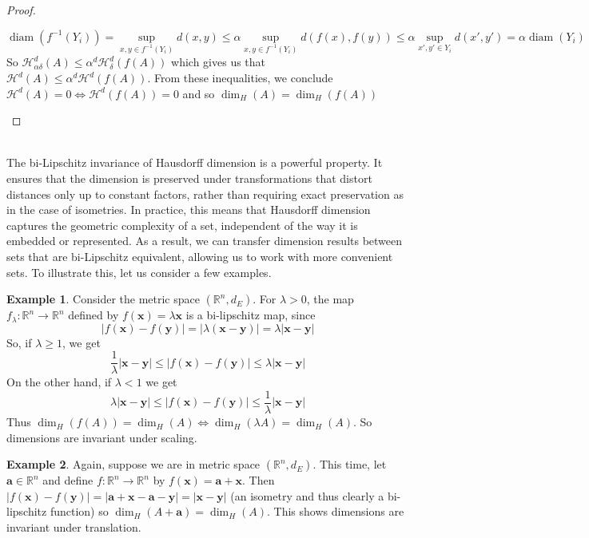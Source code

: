 \documentclass{article}
\theoremstyle{plain}
\theoremstyle{definition}
\newtheorem*{ex}{Example}
\DeclareMathOperator{\diam}{diam}
\theoremstyle{remark}
\begin{document}
\begin{proof}
\begin{enumerate}
        \[\diam (f^{-1}(Y_i)) = \sup \limits _{x,y \in f^{-1}(Y_i)} d(x,y) \le \alpha  \sup \limits _{x,y \in f^{-1}(Y_i)} d(f(x),f(y)) \le \alpha \sup \limits _{x',y' \in Y_i} d(x',y') = \alpha \diam (Y_i)  \]
        So $\mathcal{H}_{\alpha \delta}^d(A) \le \alpha ^d\mathcal{H}_\delta ^d(f(A))$ which gives us that $ \mathcal{H}^d(A) \le \alpha ^d\mathcal{H}^d(f(A))$. From these inequalities, we conclude $\mathcal{H}^d(A) =0 \iff \mathcal{H}^d(f(A))=0$ and so $\dim_H(A)=\dim_H(f(A))$
        \end{enumerate}
\end{proof}
~\\
The bi-Lipschitz invariance of Hausdorff dimension is a powerful property. It ensures that the dimension is preserved under transformations that distort distances only up to constant factors, rather than requiring exact preservation as in the case of isometries. In practice, this means that Hausdorff dimension captures the geometric complexity of a set, independent of the way it is embedded or represented. As a result, we can transfer dimension results between sets that are bi-Lipschitz equivalent, allowing us to work with more convenient sets. To illustrate this, let us consider a few examples.

\begin{ex}
    Consider the metric space $(\mathbb{R}^n, d_E)$. For $\lambda >0$, the map $f_\lambda :\mathbb{R}^n \to \mathbb{R}^n$ defined by $f(\mathbf{x})=\lambda \mathbf{x}$ is a bi-lipschitz map, since \[|f(\mathbf{x}) - f(\mathbf{y})| = |\lambda (\mathbf{x} - \mathbf{y})| = \lambda|\mathbf{x}-\mathbf{y}|\]So, if $\lambda \ge 1$, we get \[\frac{1}{\lambda }|\mathbf{x}-\mathbf{y}|\le |f(\mathbf{x}) - f(\mathbf{y})| \le \lambda |\mathbf{x}-\mathbf{y}|\]On the other hand, if $\lambda <1$ we get \[\lambda|\mathbf{x}-\mathbf{y}|\le |f(\mathbf{x}) - f(\mathbf{y})| \le \frac{1}{\lambda} |\mathbf{x}-\mathbf{y}|\]Thus $\dim_H(f(A)) = \dim_H(A) \iff \dim_H(\lambda A)=\dim_H(A)$. So dimensions are invariant under scaling.
\end{ex}

\begin{ex}
    Again, suppose we are in metric space $(\mathbb{R}^n, d_E)$. This time, let $\mathbf{a} \in \mathbb{R}^n$ and define $f:\mathbb{R}^n \to \mathbb{R}^n$ by $f(\mathbf{x})=\mathbf{a}+\mathbf{x}$. Then $|f(\mathbf{x} )-f(\mathbf{y})| = |\mathbf{a}+\mathbf{x}-\mathbf{a}-\mathbf{y}| = |\mathbf{x}-\mathbf{y}|$ (an isometry and thus clearly a bi-lipschitz function) so $\dim_H(A+\mathbf{a})=\dim_H(A)$. This shows dimensions are invariant under translation.
\end{ex}
\end{document}
